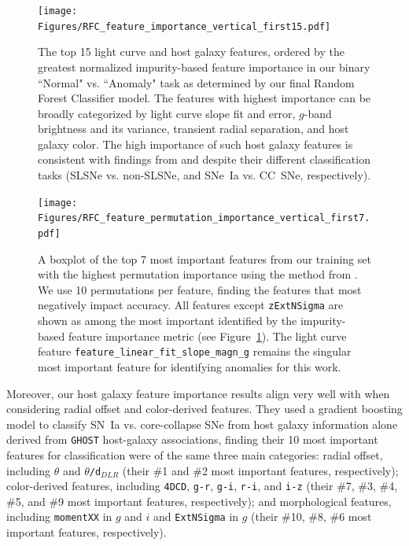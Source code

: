 \documentclass[twocolumn]{aastex63}
\begin{document}
\begin{figure}
    \centering
    \texttt{[image: Figures/RFC\_feature\_importance\_vertical\_first15.pdf]}
    \caption{
    The top 15 light curve and host galaxy features, ordered by the greatest normalized impurity-based feature importance in our binary ``Normal" vs. ``Anomaly" task as determined by our final Random Forest Classifier model. The features with highest importance can be broadly categorized by light curve slope fit and error, $g$-band brightness and its variance, transient radial separation, and host galaxy color. The high importance of such host galaxy features is consistent with findings from \cite{Gomez2020} and \cite{Gagliano2021} despite their different classification tasks (SLSNe vs. non-SLSNe, and SNe~Ia vs. CC~SNe, respectively). %
    } 
    \label{fig:RFC_feat_importance}
\end{figure}


\begin{figure}
    \centering
    \texttt{[image: Figures/RFC\_feature\_permutation\_importance\_vertical\_first7.pdf]}
    \caption{
    A boxplot of the top 7 most important features from our training set with the highest permutation importance using the method from \cite{Breiman2001}. We use 10 permutations per feature, finding the features that most negatively impact accuracy. All features except \texttt{zExtNSigma} are shown as among the most important identified by the impurity-based feature importance metric (see Figure~\ref{fig:RFC_feat_importance}). The light curve feature \texttt{feature\_linear\_fit\_slope\_magn\_g} remains the singular most important feature for identifying anomalies for this work.
    } 
    \label{fig:RFC_feat_permutation}
\end{figure}

Moreover, our host galaxy feature importance results align very well with \cite{Gagliano2021} when considering radial offset and color-derived features. They used a gradient boosting model to classify SN~Ia vs. core-collapse SNe from host galaxy information alone derived from \texttt{GHOST} host-galaxy associations, finding their 10 most important features for classification were of the same three main categories: radial offset, including \texttt{$\theta$} and \texttt{$\theta$/d$_{DLR}$} (their \#1 and \#2 most important features, respectively); color-derived features, including \texttt{4DCD}, \texttt{g-r}, \texttt{g-i}, \texttt{r-i}, and \texttt{i-z} (their \#7, \#3, \#4, \#5, and \#9 most important features, respectively); and morphological features, including \texttt{momentXX} in $g$ and $i$ and \texttt{ExtNSigma} in $g$ (their \#10, \#8, \#6 most important features, respectively). \par
\end{document}
